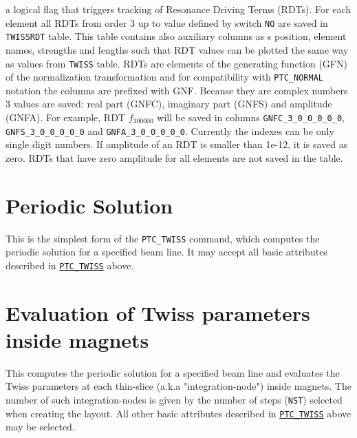 \begin{madlist}
    a logical flag that triggers tracking of Resonance Driving Terms (RDTs).
   For each element all RDTs from order 3 up to value defined by switch \texttt{NO} are saved 
   in \texttt{TWISSRDT} table. 
   This table contains also auxiliary columns as s position, element names, strengths and lengths 
   such that RDT values can be plotted the same way as values from \texttt{TWISS} table.
   RDTs are elements of the generating function (GFN) of the normalization transformation
   and for compatibility with \texttt{PTC\_NORMAL} notation the columns are prefixed with GNF.
   Because they are complex numbers 3 values are saved: real part (GNFC), imaginary part (GNFS) and amplitude (GNFA).
   For example, RDT $f_{300000}$ will be saved in columns 
   \texttt{GNFC\_3\_0\_0\_0\_0\_0}, \texttt{GNFS\_3\_0\_0\_0\_0\_0} and \texttt{GNFA\_3\_0\_0\_0\_0\_0}.
   Currently the indexes can be only single digit numbers.
   If amplitude of an RDT is smaller than 1e-12, it is saved as zero.
   RDTs that have zero amplitude for all elements are not saved in the table.
   
   
\end{madlist}


\section{Periodic Solution}
\label{sec:ptc-twiss-periodic}	

This is the simplest form of the \texttt{PTC\_TWISS} command, which
computes the periodic solution for a specified beam line. It may
accept all basic attributes described in
\hyperref[sec:ptc-twiss]{\texttt{PTC\_TWISS}} above. 



\section{Evaluation of Twiss parameters inside magnets}
\label{sec:ptc-twiss-slicing}

This computes the periodic solution for a specified beam
line and evaluates the Twiss parameters at each thin-slice
(a.k.a "integration-node") inside magnets. The number of such
integration-nodes is given by the number of steps (\texttt{NST})
selected when creating the \ptc layout. All other basic
attributes described in \hyperref[sec:ptc-twiss]{\texttt{PTC\_TWISS}}
above may be selected.

